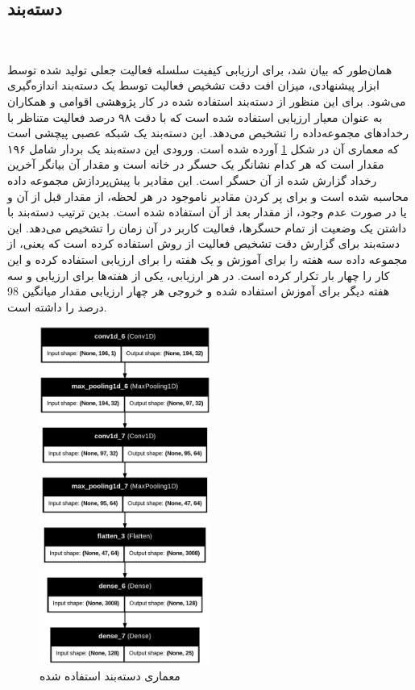 \subsection{دسته‌بند}‌

همان‌طور که بیان شد، برای ارزیابی کیفیت سلسله فعالیت‌ جعلی تولید شده توسط ابزار پیشنهادی، میزان افت دقت تشخیص فعالیت توسط یک دسته‌بند اندازه‌گیری می‌شود. برای این منظور از دسته‌بند استفاده شده در کار پژوهشی اقوامی و همکاران \cite{x3341} به عنوان معیار ارزیابی استفاده شده است که با دقت ۹۸ درصد فعالیت متناظر با رخدادهای مجموعه‌داده  را تشخیص می‌دهد. این دسته‌بند یک شبکه عصبی پیچشی است که معماری آن در شکل \ref{fig:fO4H5} آورده شده است. ورودی این دسته‌بند یک بردار شامل ۱۹۶ مقدار است که هر کدام نشانگر یک حسگر در خانه است و مقدار آن بیانگر آخرین رخداد گزارش شده از آن حسگر است. این مقادیر با پیش‌پردازش مجموعه داده محاسبه شده است و برای پر کردن مقادیر ناموجود در هر لحظه، از مقدار قبل از آن و یا در صورت عدم وجود، از مقدار بعد از آن استفاده شده است. بدین ترتیب دسته‌بند با داشتن یک وضعیت از تمام حسگرها، فعالیت کاربر در آن زمان را تشخیص می‌دهد. این دسته‌بند برای گزارش دقت تشخیص فعالیت از روش  استفاده کرده است که یعنی، از مجموعه داده  سه هفته را برای آموزش و یک هفته را برای ارزیابی استفاده کرده و این کار را چهار بار تکرار کرده است. در هر ارزیابی، یکی از هفته‌ها برای ارزیابی و سه هفته دیگر برای آموزش استفاده شده و خروجی هر چهار ارزیابی مقدار میانگین 98 درصد را داشته‌ است.

\begin{figure}[H]
\centerline{\includegraphics[width=0.5\textwidth]{figs/fO4H5.png}}
\caption{معماری دسته‌بند استفاده شده}
\label{fig:fO4H5}
\end{figure}

